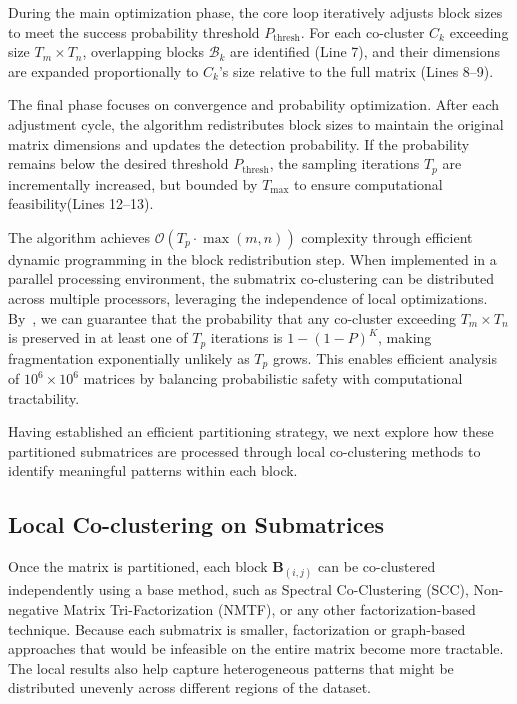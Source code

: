 \documentclass[journal]{IEEEtran}
\begin{document}
During the main optimization phase, the core loop iteratively adjusts block sizes to meet the success probability threshold $P_{\text{thresh}}$. For each co-cluster $C_k$ exceeding size $T_m \times T_n$, overlapping blocks $\mathcal{B}_k$ are identified (Line 7), and their dimensions are expanded proportionally to $C_k$'s size relative to the full matrix (Lines 8--9).

The final phase focuses on convergence and probability optimization. After each adjustment cycle, the algorithm redistributes block sizes to maintain the original matrix dimensions and updates the detection probability. If the probability remains below the desired threshold $P_{\text{thresh}}$, the sampling iterations $T_p$ are incrementally increased, but bounded by $T_{\text{max}}$ to ensure computational feasibility(Lines 12--13).


The algorithm achieves $\mathcal{O}(T_p \cdot \max(m,n))$ complexity through efficient dynamic programming in the block redistribution step. When implemented in a parallel processing environment, the submatrix co-clustering can be distributed across multiple processors, leveraging the independence of local optimizations.
By~, we can guarantee that the probability that any co-cluster exceeding $T_m \times T_n$ is preserved in at least one of $T_p$ iterations is $1 - (1 - P)^K$, making fragmentation exponentially unlikely as $T_p$ grows. This enables efficient analysis of $10^6 \times 10^6$ matrices by balancing probabilistic safety with computational tractability.

Having established an efficient partitioning strategy, we next explore how these partitioned submatrices are processed through local co-clustering methods to identify meaningful patterns within each block.


\subsection{Local Co-clustering on Submatrices}
\label{subsec:local_co_clustering}
Once the matrix is partitioned, each block $\mathbf{B}_{(i,j)}$ can be co-clustered independently using a base method, such as Spectral Co-Clustering (SCC), Non-negative Matrix Tri-Factorization (NMTF), or any other factorization-based technique. Because each submatrix is smaller, factorization or graph-based approaches that would be infeasible on the entire matrix become more tractable. The local results also help capture heterogeneous patterns that might be distributed unevenly across different regions of the dataset.
\end{document}
